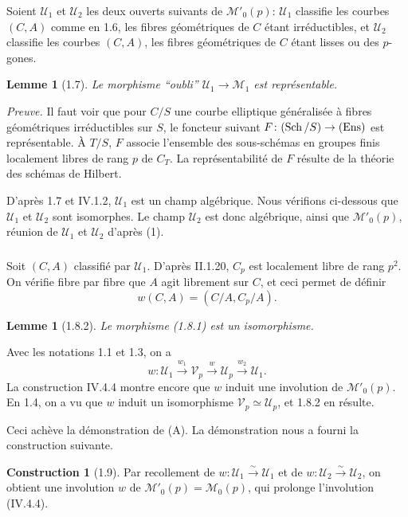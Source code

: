 \documentclass[11pt,a4paper]{amsart}
\theoremstyle{plain}
\newtheorem{lemma}[theorem]{Lemme}
\theoremstyle{definition}
\newtheorem{construction}[theorem]{Construction}
\DeclareMathOperator{\Sch}{Sch}
\newcommand{\CU}{\mathcal{U}}
\newcommand{\CV}{\mathcal{V}}
\newcommand{\mll}{\mathcal{M}}
\newcommand{\ens}{\textup{Ens}}
\begin{document}
Soient $\CU_1$ et $\CU_2$ les deux ouverts suivants de $\mll'_0(p)$: $\CU_1$ classifie les courbes $(C,A)$ comme en 1.6, les fibres g\'eom\'etriques de $C$ \'etant irr\'eductibles, et $\CU_2$ classifie les courbes $(C,A)$, les fibres g\'eom\'etriques de $C$ \'etant lisses ou des $p$-gones.

\begin{lemma}[1.7]
Le morphisme ``oubli'' $\CU_1 \to \mll_1$ est repr\'esentable.
\end{lemma}

\noindent\textit{Preuve.} Il faut voir que pour $C/S$ une courbe elliptique g\'en\'eralis\'ee \`a fibres g\'eom\'etriques irr\'eductibles sur $S$, le foncteur suivant $F \colon (\Sch/S) \to (\ens)$ est repr\'esentable. \`A $T/S$, $F$ associe l'ensemble des sous-sch\'emas en groupes finis localement libres de rang $p$ de $C_T$. La repr\'esentabilit\'e de $F$ r\'esulte de la th\'eorie des sch\'emas de Hilbert.

D'apr\`es 1.7 et IV.1.2, $\CU_1$ est un champ alg\'ebrique. Nous v\'erifions ci-dessous que $\CU_1$ et $\CU_2$ sont isomorphes. Le champ $\CU_2$ est donc alg\'ebrique, ainsi que $\mll'_0(p)$, r\'eunion de $\CU_1$ et $\CU_2$ d'apr\`es (1).

\subsubsection{}
Soit $(C,A)$ classifi\'e par $\CU_1$. D'apr\`es II.1.20, $C_p$ est localement libre de rang $p^2$. On v\'erifie fibre par fibre que $A$ agit librement sur $C$, et ceci permet de d\'efinir
\begin{equation}\label{eq:1.8.0}
w(C,A) = (C/A, C_p/A).
\end{equation}

\begin{lemma}[1.8.2]
Le morphisme (1.8.1) est un isomorphisme.
\end{lemma}

Avec les notations 1.1 et 1.3, on a
\[
w \colon \CU_1 \xrightarrow{w_1} \CV_p \xrightarrow{w} \CU_p \xrightarrow{w_2} \CU_1.
\]
La construction IV.4.4 montre encore que $w$ induit une involution de $\mll'_0(p)$. En 1.4, on a vu que $w$ induit un isomorphisme $\CV_p \simeq \CU_p$, et 1.8.2 en r\'esulte.

Ceci ach\`eve la d\'emonstration de (A). La d\'emonstration nous a fourni la construction suivante.

\begin{construction}[1.9]
Par recollement de $w \colon \CU_1 \xrightarrow{\sim} \CU_1$ et de $w \colon \CU_2 \xrightarrow{\sim} \CU_2$, on obtient une involution $w$ de $\mll'_0(p) = \mll_0(p)$, qui prolonge l'involution (IV.4.4).
\end{construction}
\end{document}

